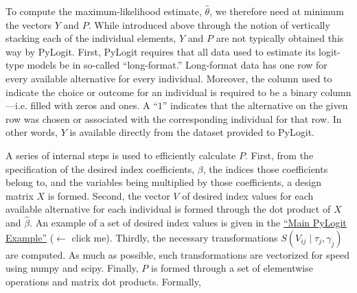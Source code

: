 \documentclass{article}
\begin{document}
To compute the maximum-likelihood estimate, $\hat{\theta}$, we therefore need at minimum the vectors $Y$ and $P$. While introduced above through the notion of vertically stacking each of the individual elements, $Y$ and $P$ are not typically obtained this way by PyLogit. First, PyLogit requires that all data used to estimate its logit-type models be in so-called ``long-format.'' Long-format data has one row for every available alternative for every individual. Moreover, the column used to indicate the choice or outcome for an individual is required to be a binary column---i.e. filled with zeros and ones. A ``$1$'' indicates that the alternative on the given row was chosen or associated with the corresponding individual for that row. In other words, $Y$ is available directly from the dataset provided to PyLogit.

A series of internal steps is used to efficiently calculate $P$. First, from the specification of the desired index coefficients, $\beta$, the indices those coefficients belong to, and the variables being multiplied by those coefficients, a design matrix $X$ is formed. Second, the vector $V$ of desired index values for each available alternative for each individual is formed through the dot product of $X$ and $\hat{\beta}$. An example of a set of desired index values is given in the \href{https://github.com/timothyb0912/pylogit/blob/master/examples/Main\%20PyLogit\%20Example.ipynb}{``Main PyLogit Example''} ($\leftarrow$ click me). Thirdly, the necessary transformations $S \left( V_{ij} \mid \tau _j, \gamma _j \right)$ are computed. As much as possible, such transformations are vectorized for speed using numpy and scipy. Finally, $P$ is formed through a set of elementwise operations and matrix dot products. Formally,
\end{document}
